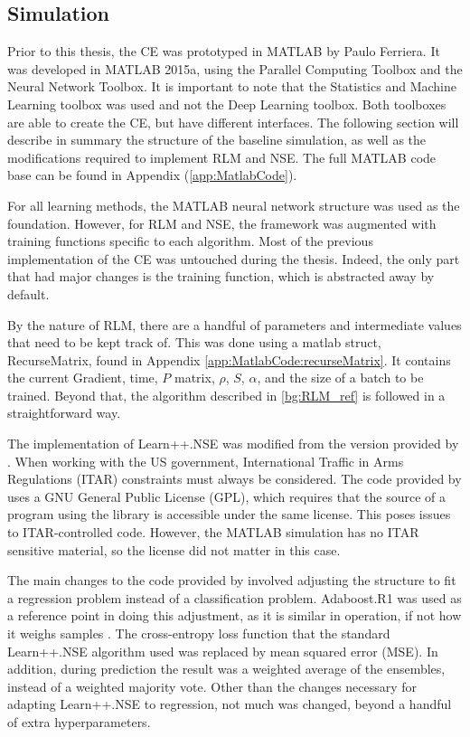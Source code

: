 \subsection{Simulation}
\par Prior to this thesis, the CE was prototyped in MATLAB by Paulo Ferriera\cite{paulo_theory_paper}. It was developed in MATLAB 2015a, using the Parallel Computing Toolbox and the Neural Network Toolbox. It is important to note that the Statistics and Machine Learning toolbox was used and not the Deep Learning toolbox. Both toolboxes are able to create the CE, but have different interfaces. The following section will describe in summary the structure of the baseline simulation, as well as the modifications required to implement RLM and NSE. The full MATLAB code base can be found in Appendix (\ref{app:MatlabCode}).
\par For all learning methods, the MATLAB neural network structure was used as the foundation. However, for RLM and NSE, the framework was augmented with training functions specific to each algorithm. Most of the previous implementation of the CE was untouched during the thesis. Indeed, the only part that had major changes is the training function, which is abstracted away by default. 
\par By the nature of RLM, there are a handful of parameters and intermediate values that need to be kept track of. This was done using a matlab struct, RecurseMatrix, found in Appendix \ref{app:MatlabCode:recurseMatrix}. It contains the current Gradient, time, $P$ matrix, $\rho$, $S$, $\alpha$, and the size of a batch to be trained. Beyond that, the algorithm described in \ref{bg:RLM_ref} is followed in a straightforward way.   
\par  The implementation of Learn++.NSE was modified from the version provided by \cite{learnpp_repo}. When working with the US government, International Traffic in Arms Regulations (ITAR) constraints must always be considered. The code provided by \cite{learnpp_repo} uses a GNU General Public License (GPL), which requires that the source of a program using the library is accessible under the same license. This poses issues to ITAR-controlled code. However, the MATLAB simulation has no ITAR sensitive material, so the license did not matter in this case.
\par The main changes to the code provided by \cite{learnpp_repo} involved adjusting the structure to fit a regression problem instead of a classification problem. Adaboost.R1 was used as a reference point in doing this adjustment, as it is similar in operation, if not how it weighs samples \cite{adaboostPaper}. The cross-entropy loss function that the standard Learn++.NSE algorithm used \cite{learnNseIntro} was replaced by mean squared error (MSE). In addition, during prediction the result was a weighted average of the ensembles, instead of a weighted majority vote. Other than the changes necessary for adapting Learn++.NSE to regression, not much was changed, beyond a handful of extra hyperparameters. 

